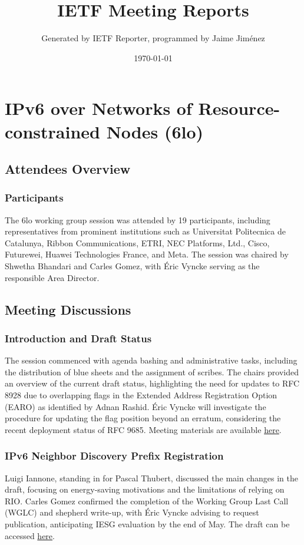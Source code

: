 \documentclass{article}
\title{IETF Meeting Reports}
\author{Generated by IETF Reporter, programmed by Jaime Jiménez}
\date{\today}
\begin{document}
\maketitle
\tableofcontents
\newpage

\section{IPv6 over Networks of Resource-constrained Nodes (6lo)}

\subsection{Attendees Overview}
\subsubsection{Participants}
The 6lo working group session was attended by 19 participants, including representatives from prominent institutions such as Universitat Politecnica de Catalunya, Ribbon Communications, ETRI, NEC Platforms, Ltd., Cisco, Futurewei, Huawei Technologies France, and Meta. The session was chaired by Shwetha Bhandari and Carles Gomez, with Éric Vyncke serving as the responsible Area Director.

\subsection{Meeting Discussions}

\subsubsection{Introduction and Draft Status}
The session commenced with agenda bashing and administrative tasks, including the distribution of blue sheets and the assignment of scribes. The chairs provided an overview of the current draft status, highlighting the need for updates to RFC 8928 due to overlapping flags in the Extended Address Registration Option (EARO) as identified by Adnan Rashid. Éric Vyncke will investigate the procedure for updating the flag position beyond an erratum, considering the recent deployment status of RFC 9685. Meeting materials are available \href{https://datatracker.ietf.org/meeting/122/materials/slides-122-6lo-6lo-chairs-introduction-01}{here}.

\subsubsection{IPv6 Neighbor Discovery Prefix Registration}
Luigi Iannone, standing in for Pascal Thubert, discussed the main changes in the draft, focusing on energy-saving motivations and the limitations of relying on RIO. Carles Gomez confirmed the completion of the Working Group Last Call (WGLC) and shepherd write-up, with Éric Vyncke advising to request publication, anticipating IESG evaluation by the end of May. The draft can be accessed \href{https://datatracker.ietf.org/doc/html/draft-ietf-6lo-prefix-registration-06}{here}.
\end{document}
